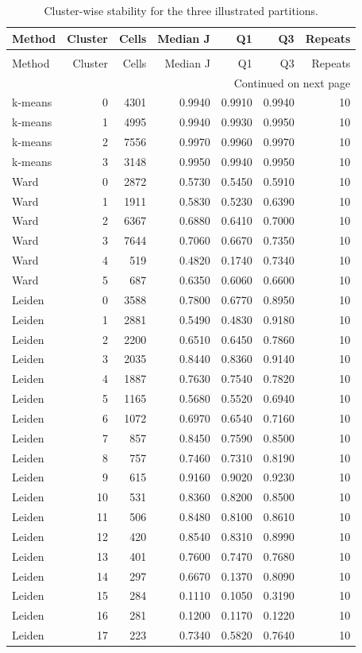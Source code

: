 \begin{longtable}{lrrrrrr}
\caption{Cluster-wise stability for the three illustrated partitions.} \label{tab:clusterstability} \\
\toprule
Method & Cluster & Cells & Median J & Q1 & Q3 & Repeats \\
\midrule
\endfirsthead
\caption[]{Cluster-wise stability for the three illustrated partitions.} \\
\toprule
Method & Cluster & Cells & Median J & Q1 & Q3 & Repeats \\
\midrule
\endhead
\midrule
\multicolumn{7}{r}{Continued on next page} \\
\midrule
\endfoot
\bottomrule
\endlastfoot
k-means & 0 & 4301 & 0.9940 & 0.9910 & 0.9940 & 10 \\
k-means & 1 & 4995 & 0.9940 & 0.9930 & 0.9950 & 10 \\
k-means & 2 & 7556 & 0.9970 & 0.9960 & 0.9970 & 10 \\
k-means & 3 & 3148 & 0.9950 & 0.9940 & 0.9950 & 10 \\
Ward & 0 & 2872 & 0.5730 & 0.5450 & 0.5910 & 10 \\
Ward & 1 & 1911 & 0.5830 & 0.5230 & 0.6390 & 10 \\
Ward & 2 & 6367 & 0.6880 & 0.6410 & 0.7000 & 10 \\
Ward & 3 & 7644 & 0.7060 & 0.6670 & 0.7350 & 10 \\
Ward & 4 & 519 & 0.4820 & 0.1740 & 0.7340 & 10 \\
Ward & 5 & 687 & 0.6350 & 0.6060 & 0.6600 & 10 \\
Leiden & 0 & 3588 & 0.7800 & 0.6770 & 0.8950 & 10 \\
Leiden & 1 & 2881 & 0.5490 & 0.4830 & 0.9180 & 10 \\
Leiden & 2 & 2200 & 0.6510 & 0.6450 & 0.7860 & 10 \\
Leiden & 3 & 2035 & 0.8440 & 0.8360 & 0.9140 & 10 \\
Leiden & 4 & 1887 & 0.7630 & 0.7540 & 0.7820 & 10 \\
Leiden & 5 & 1165 & 0.5680 & 0.5520 & 0.6940 & 10 \\
Leiden & 6 & 1072 & 0.6970 & 0.6540 & 0.7160 & 10 \\
Leiden & 7 & 857 & 0.8450 & 0.7590 & 0.8500 & 10 \\
Leiden & 8 & 757 & 0.7460 & 0.7310 & 0.8190 & 10 \\
Leiden & 9 & 615 & 0.9160 & 0.9020 & 0.9230 & 10 \\
Leiden & 10 & 531 & 0.8360 & 0.8200 & 0.8500 & 10 \\
Leiden & 11 & 506 & 0.8480 & 0.8100 & 0.8610 & 10 \\
Leiden & 12 & 420 & 0.8540 & 0.8310 & 0.8990 & 10 \\
Leiden & 13 & 401 & 0.7600 & 0.7470 & 0.7680 & 10 \\
Leiden & 14 & 297 & 0.6670 & 0.1370 & 0.8090 & 10 \\
Leiden & 15 & 284 & 0.1110 & 0.1050 & 0.3190 & 10 \\
Leiden & 16 & 281 & 0.1200 & 0.1170 & 0.1220 & 10 \\
Leiden & 17 & 223 & 0.7340 & 0.5820 & 0.7640 & 10 \\
\end{longtable}
